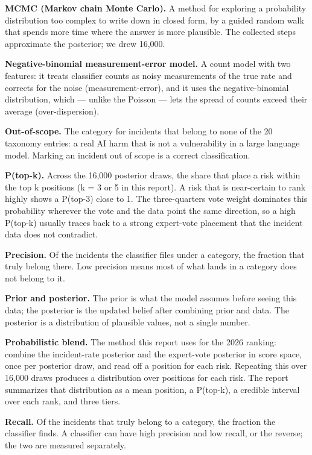 \documentclass[11pt]{article}
\begin{document}
\textbf{MCMC (Markov chain Monte Carlo).} A method for exploring a
probability distribution too complex to write down in closed form, by a
guided random walk that spends more time where the answer is more
plausible. The collected steps approximate the posterior; we drew
16,000.

\textbf{Negative-binomial measurement-error model.} A count model with
two features: it treats classifier counts as noisy measurements of the
true rate and corrects for the noise (measurement-error), and it uses
the negative-binomial distribution, which --- unlike the Poisson ---
lets the spread of counts exceed their average (over-dispersion).

\textbf{Out-of-scope.} The category for incidents that belong to none of
the 20 taxonomy entries: a real AI harm that is not a vulnerability in a
large language model. Marking an incident out of scope is a correct
classification.

\textbf{P(top-k).} Across the 16,000 posterior draws, the share that
place a risk within the top k positions (k = 3 or 5 in this report). A
risk that is near-certain to rank highly shows a P(top-3) close to 1.
The three-quarters vote weight dominates this probability wherever the
vote and the data point the same direction, so a high P(top-k) usually
traces back to a strong expert-vote placement that the incident data
does not contradict.

\textbf{Precision.} Of the incidents the classifier files under a
category, the fraction that truly belong there. Low precision means most
of what lands in a category does not belong to it.

\textbf{Prior and posterior.} The prior is what the model assumes before
seeing this data; the posterior is the updated belief after combining
prior and data. The posterior is a distribution of plausible values, not
a single number.

\textbf{Probabilistic blend.} The method this report uses for the 2026
ranking: combine the incident-rate posterior and the expert-vote
posterior in score space, once per posterior draw, and read off a
position for each risk. Repeating this over 16,000 draws produces a
distribution over positions for each risk. The report summarizes that
distribution as a mean position, a P(top-k), a credible interval over
each rank, and three tiers.

\textbf{Recall.} Of the incidents that truly belong to a category, the
fraction the classifier finds. A classifier can have high precision and
low recall, or the reverse; the two are measured separately.
\end{document}
